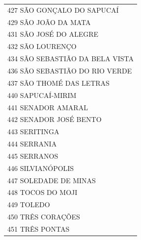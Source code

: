 \documentclass{article}
\begin{document}
\begin{longtable}[c]{m{18cm}}
\multicolumn{1}{l}{ \hspace{2em} 427 SÃO GONÇALO DO SAPUCAÍ } \\
\multicolumn{1}{l}{ \hspace{2em} 429 SÃO JOÃO DA MATA } \\
\multicolumn{1}{l}{ \hspace{2em} 431 SÃO JOSÉ DO ALEGRE } \\
\multicolumn{1}{l}{ \hspace{2em} 432 SÃO LOURENÇO } \\
\multicolumn{1}{l}{ \hspace{2em} 434 SÃO SEBASTIÃO DA BELA VISTA } \\
\multicolumn{1}{l}{ \hspace{2em} 436 SÃO SEBASTIÃO DO RIO VERDE } \\
\multicolumn{1}{l}{ \hspace{2em} 437 SÃO THOMÉ DAS LETRAS } \\
\multicolumn{1}{l}{ \hspace{2em} 440 SAPUCAÍ-MIRIM } \\
\multicolumn{1}{l}{ \hspace{2em} 441 SENADOR AMARAL } \\
\multicolumn{1}{l}{ \hspace{2em} 442 SENADOR JOSÉ BENTO } \\
\multicolumn{1}{l}{ \hspace{2em} 443 SERITINGA } \\
\multicolumn{1}{l}{ \hspace{2em} 444 SERRANIA } \\
\multicolumn{1}{l}{ \hspace{2em} 445 SERRANOS } \\
\multicolumn{1}{l}{ \hspace{2em} 446 SILVIANÓPOLIS } \\
\multicolumn{1}{l}{ \hspace{2em} 447 SOLEDADE DE MINAS } \\
\multicolumn{1}{l}{ \hspace{2em} 448 TOCOS DO MOJI } \\
\multicolumn{1}{l}{ \hspace{2em} 449 TOLEDO } \\
\multicolumn{1}{l}{ \hspace{2em} 450 TRÊS CORAÇÕES } \\
\multicolumn{1}{l}{ \hspace{2em} 451 TRÊS PONTAS } \\

\end{longtable}
\end{document}
